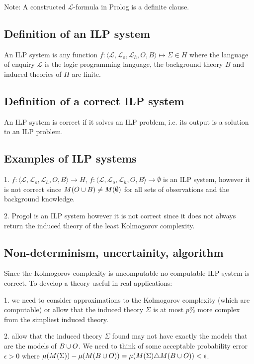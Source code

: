 Note: A constructed $\mathcal{L}$-formula in Prolog is a definite clause. 

\subsection{Definition of an ILP system}
An ILP system is any function $f:\langle\mathcal{L}, \mathcal{L}_o, \mathcal{L}_h, O, B\rangle \mapsto \Sigma \in H$ where the language of enquiry $\mathcal{L}$ is the logic programming language, the background theory $B$ and induced theories of $H$ are finite.

\subsection{Definition of a correct ILP system}
An ILP system is correct if it solves an ILP problem, i.e. its output is a solution to an ILP problem.

\subsection{Examples of ILP systems}
1. $f:\langle\mathcal{L}, \mathcal{L}_o, \mathcal{L}_h, O, B\rangle \to H$, $f:\langle\mathcal{L}, \mathcal{L}_o, \mathcal{L}_h, O, B\rangle \to \emptyset$ is an ILP system, however it is not correct since $M(O \cup B) \not= M(\emptyset)$ for all sets of observations and the background knowledge.

2. Progol is an ILP system however it is not correct since it does not always return the induced theory of the least Kolmogorov complexity.

\subsection{Non-determinism, uncertainity, algorithm}

Since the Kolmogorov complexity is uncomputable no computable ILP system is correct. To develop a theory useful in real applications:

1. we need to consider approximations to the Kolmogorov complexity (which are computable) or allow that the induced theory $\Sigma$ is at most $p\%$ more complex from the simpliest induced theory.

2. allow that the induced theory $\Sigma$ found may not have exactly the models that are the models of $B \cup O$. We need to think of some acceptable probability error $\epsilon>0$ where $\mu(M(\Sigma))-\mu(M(B \cup O)) = \mu(M(\Sigma)  \triangle  M(B \cup O)) < \epsilon$.

